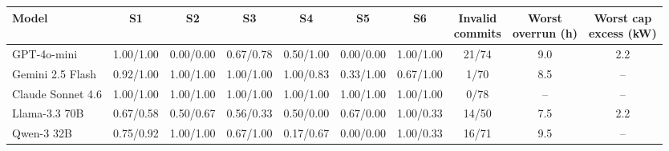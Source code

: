 \begin{tabular}{lccccccccc}
\toprule
Model & S1 & S2 & S3 & S4 & S5 & S6 & \makecell{Invalid\\commits} & \makecell{Worst\\overrun (h)} & \makecell{Worst cap\\excess (kW)} \\
\midrule
GPT-4o-mini & 1.00/1.00 & 0.00/0.00 & 0.67/0.78 & 0.50/1.00 & 0.00/0.00 & 1.00/1.00 & 21/74 & 9.0 & 2.2 \\
Gemini 2.5 Flash & 0.92/1.00 & 1.00/1.00 & 1.00/1.00 & 1.00/0.83 & 0.33/1.00 & 0.67/1.00 & 1/70 & 8.5 & -- \\
Claude Sonnet 4.6 & 1.00/1.00 & 1.00/1.00 & 1.00/1.00 & 1.00/1.00 & 1.00/1.00 & 1.00/1.00 & 0/78 & -- & -- \\
\midrule
Llama-3.3 70B & 0.67/0.58 & 0.50/0.67 & 0.56/0.33 & 0.50/0.00 & 0.67/0.00 & 1.00/0.33 & 14/50 & 7.5 & 2.2 \\
Qwen-3 32B & 0.75/0.92 & 1.00/1.00 & 0.67/1.00 & 0.17/0.67 & 0.00/0.00 & 1.00/0.33 & 16/71 & 9.5 & -- \\
\bottomrule
\end{tabular}
